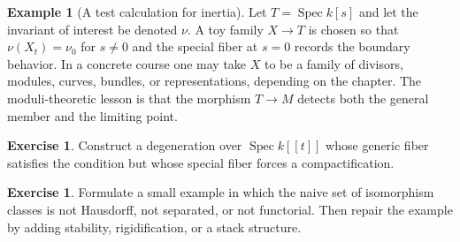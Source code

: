 \documentclass[11pt]{amsart}
\theoremstyle{definition}
\newtheorem{example}[theorem]{Example}
\newtheorem{exercise}[theorem]{Exercise}
\newcommand{\Spec}{\operatorname{Spec}}
\begin{document}
\begin{example}[A test calculation for inertia]
Let $T=\Spec k[s]$ and let the invariant of interest be denoted $\nu$.  A toy family $X\to T$ is chosen so that $\nu(X_t)=\nu_0$ for $s\ne0$ and the special fiber at $s=0$ records the boundary behavior.  In a concrete course one may take $X$ to be a family of divisors, modules, curves, bundles, or representations, depending on the chapter.  The moduli-theoretic lesson is that the morphism $T\to M$ detects both the general member and the limiting point.
\end{example}
\begin{exercise}
Construct a degeneration over $\Spec k[[t]]$ whose generic fiber satisfies the condition but whose special fiber forces a compactification.
\end{exercise}
\begin{exercise}
Formulate a small example in which the naive set of isomorphism classes is not Hausdorff, not separated, or not functorial.  Then repair the example by adding stability, rigidification, or a stack structure.
\end{exercise}
\clearpage
\end{document}
